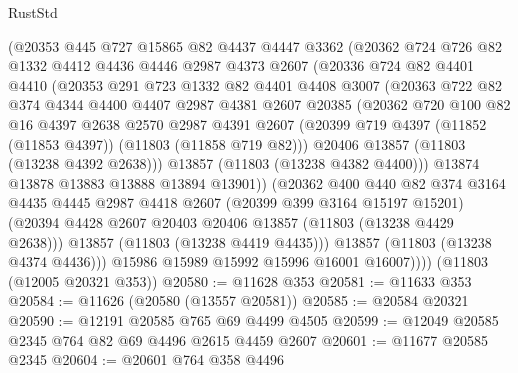 \begin{lexlean}{RustStd}
\begin{coremodule}
          (@20353
            @445
            @727
            @15865
            @82
            @4437
            @4447
            @3362
            (@20362
              @724
              @726
              @82
              @1332
              @4412
              @4436
              @4446
              @2987
              @4373
              @2607
              (@20336
                @724
                @82
                @4401
                @4410
                (@20353
                  @291
                  @723
                  @1332
                  @82
                  @4401
                  @4408
                  @3007
                  (@20363
                    @722
                    @82
                    @374
                    @4344
                    @4400
                    @4407
                    @2987
                    @4381
                    @2607
                    @20385
                    (@20362
                      @720
                      @100
                      @82
                      @16
                      @4397
                      @2638
                      @2570
                      @2987
                      @4391
                      @2607
                      (@20399 @719 @4397 (@11852 (@11853 @4397)) (@11803 (@11858 @719 @82)))
                      @20406
                      @13857
                      (@11803 (@13238 @4392 @2638)))
                    @13857
                    (@11803 (@13238 @4382 @4400)))
                  @13874
                  @13878
                  @13883
                  @13888
                  @13894
                  @13901))
              (@20362
                @400
                @440
                @82
                @374
                @3164
                @4435
                @4445
                @2987
                @4418
                @2607
                (@20399 @399 @3164 @15197 @15201)
                (@20394 @4428 @2607 @20403 @20406 @13857 (@11803 (@13238 @4429 @2638)))
                @13857
                (@11803 (@13238 @4419 @4435)))
              @13857
              (@11803 (@13238 @4374 @4436)))
            @15986
            @15989
            @15992
            @15996
            @16001
            @16007))))
    (@11803 (@12005 @20321 @353))
@20580 := @11628 @353
@20581 := @11633 @353
@20584 := @11626 (@20580 (@13557 @20581))
@20585 := @20584 @20321
@20590 := @12191 @20585 @765 @69 @4499 @4505
@20599 := @12049 @20585 @2345 @764 @82 @69 @4496 @2615 @4459 @2607
@20601 := @11677 @20585 @2345
@20604 := @20601 @764 @358 @4496

\end{coremodule}
\end{lexlean}
